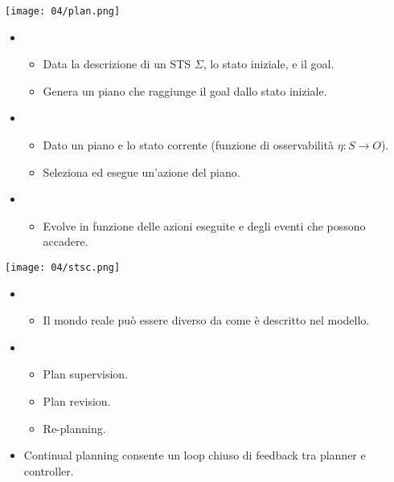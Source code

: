 \begin{minipage}{0.4\textwidth}
    \centering
    \texttt{[image: 04/plan.png]}
\end{minipage}
\hfill
\begin{minipage}{0.5\textwidth}
    \begin{itemize}
        \item {}
        \begin{itemize}
            \item Data la descrizione di un STS $\Sigma$, lo stato iniziale, e il goal.
            \item Genera un piano che raggiunge il goal dallo stato iniziale.
        \end{itemize}

        \item {}
        \begin{itemize}
            \item Dato un piano e lo stato corrente (funzione di osservabilità $\eta : S \rightarrow O$).
            \item Seleziona ed esegue un’azione del piano.
        \end{itemize}

        \item {}
        \begin{itemize}
            \item Evolve in funzione delle azioni eseguite e degli eventi che possono accadere.
        \end{itemize}
    \end{itemize}
\end{minipage}


\begin{minipage}{0.4\textwidth}
    \centering
    \texttt{[image: 04/stsc.png]}
\end{minipage}
\hfill
\begin{minipage}{0.5\textwidth}
    \begin{itemize}
        \item {}
        \begin{itemize}
            \item Il mondo reale può essere diverso da come è descritto nel modello.
        \end{itemize}
        \item {}
        \begin{itemize}
            \item Plan supervision.
            \item Plan revision.
            \item Re-planning.
        \end{itemize}

        \item Continual planning consente un loop chiuso di feedback tra planner e controller.
    \end{itemize}
\end{minipage}

